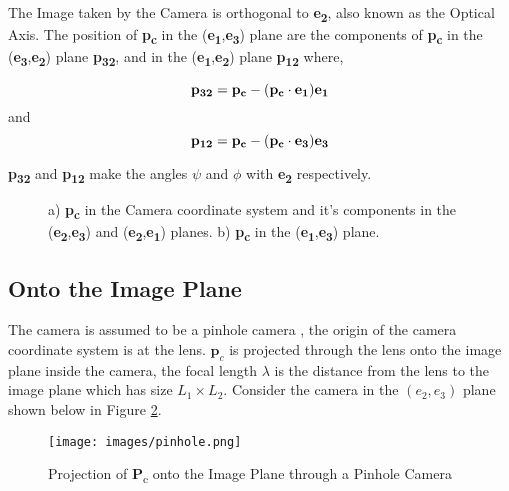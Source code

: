 \documentclass[12pt]{article}
\begin{document}
 The Image taken by the Camera is orthogonal to \textbf{e\textsubscript{2}}, also known as the Optical Axis. The position of \textbf{p\textsubscript{c}} in the (\textbf{e\textsubscript{1}},\textbf{e\textsubscript{3}}) plane are the components of \textbf{p\textsubscript{c}} in the (\textbf{e\textsubscript{3}},\textbf{e\textsubscript{2}}) plane \textbf{p\textsubscript{32}}, and  in the  (\textbf{e\textsubscript{1}},\textbf{e\textsubscript{2}}) plane \textbf{p\textsubscript{12}} where,

$$ \textbf{p\textsubscript{32}} =  \textbf{p\textsubscript{c}} - ( \textbf{p\textsubscript{c}}\cdot\textbf{e\textsubscript{1}})\textbf{e\textsubscript{1}} $$ 
and
$$ \textbf{p\textsubscript{12}} =  \textbf{p\textsubscript{c}} - ( \textbf{p\textsubscript{c}}\cdot\textbf{e\textsubscript{3}})\textbf{e\textsubscript{3}} $$

\textbf{p\textsubscript{32}} and \textbf{p\textsubscript{12}} make the angles $\psi$ and $\phi$ with \textbf{e\textsubscript{2}} respectively.


\begin{figure}[h]
    \centering
    \qquad
    \caption{a) \textbf{p\textsubscript{c}} in the Camera coordinate system and it's components in the (\textbf{e\textsubscript{2}},\textbf{e\textsubscript{3}}) and (\textbf{e\textsubscript{2}},\textbf{e\textsubscript{1}}) planes. b) \textbf{p\textsubscript{c}} in the (\textbf{e\textsubscript{1}},\textbf{e\textsubscript{3}}) plane.} %
    \label{fig:example}%
\end{figure}

\subsection{Onto the Image Plane}\label{ontotheplane}

The camera is assumed to be a pinhole camera \cite{pinholeModel}, the origin of the camera coordinate system is at the lens. $\textbf{p}_c$ is projected through the lens onto the image plane inside the camera, the focal length $\lambda$ is the distance from the lens to the image plane which has size $L_1 \times L_2$. Consider the camera in the $(e_2,e_3)$ plane shown below in Figure \ref{fig:pinhole}.

\begin{figure}[h]
\centering
\texttt{[image: images/pinhole.png]}
\caption{Projection of \textbf{P}\textsubscript{c} onto the Image Plane through a Pinhole Camera}\label{fig:pinhole}
\end{figure}
\end{document}
